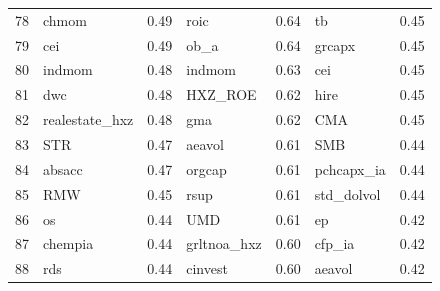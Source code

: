 \begin{footnotesize}
\begin{longtable}{rlc|lc|lc}
		78                        & chmom                       & 0.49                          & roic                        & 0.64                          & tb                                & 0.45           \\
		79                        & cei                         & 0.49                          & ob\_a                       & 0.64                          & grcapx                            & 0.45           \\
		80                        & indmom                      & 0.48                          & indmom                      & 0.63                          & cei                               & 0.45           \\
		81                        & dwc                         & 0.48                          & HXZ\_ROE                    & 0.62                          & hire                              & 0.45           \\
		82                        & realestate\_hxz             & 0.48                          & gma                         & 0.62                          & CMA                               & 0.45           \\
		83                        & STR                         & 0.47                          & aeavol                      & 0.61                          & SMB                               & 0.44           \\
		84                        & absacc                      & 0.47                          & orgcap                      & 0.61                          & pchcapx\_ia                       & 0.44           \\
		85                        & RMW                         & 0.45                          & rsup                        & 0.61                          & std\_dolvol                       & 0.44           \\
		86                        & os                          & 0.44                          & UMD                         & 0.61                          & ep                                & 0.42           \\
		87                        & chempia                     & 0.44                          & grltnoa\_hxz                & 0.60                          & cfp\_ia                           & 0.42           \\
		88                        & rds                         & 0.44                          & cinvest                     & 0.60                          & aeavol                            & 0.42           \\

\end{longtable}
\end{footnotesize}
